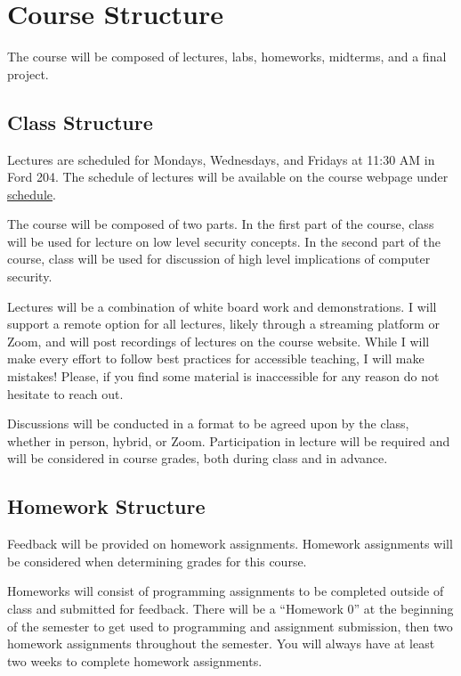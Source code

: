 \documentclass[11pt]{article}
\begin{document}

\section*{Course Structure}

The course will be composed of lectures, labs, homeworks, midterms, and a final project.

\subsection*{Class Structure}

Lectures are scheduled for Mondays, Wednesdays, and Fridays at 11:30 AM in Ford 204. The schedule
of lectures will be available on the course webpage under \href{https://cd-public.github.io/courses/computer_security/s-451f21.html}{schedule}.

The course will be composed of two parts. In the first part of the course, class will be used for lecture on low level security concepts. In the second part of the course, class will be used for discussion of high level implications of computer security.

Lectures will be a combination of white board work and demonstrations. I will support a remote option
for all lectures, likely through a streaming platform or Zoom, and will post recordings of lectures
on the course website. While I will make every effort to follow best practices for accessible teaching, I will make mistakes! Please, if you find some material is inaccessible for any reason
do not hesitate to reach out.

Discussions will be conducted in a format to be agreed upon by the class, whether in person, hybrid, or Zoom. Participation in lecture will be required and will be considered in course grades, both during class and in advance.


\subsection*{Homework Structure}

Feedback will be provided on homework assignments. Homework assignments will be considered when determining grades for this course.

Homeworks will consist of programming assignments to be completed outside of class and submitted
for feedback. There will be a ``Homework 0'' at the beginning of the semester to get used to
programming and assignment submission, then two homework assignments throughout the semester.
You will always have at least two weeks to complete homework assignments.
\end{document}

